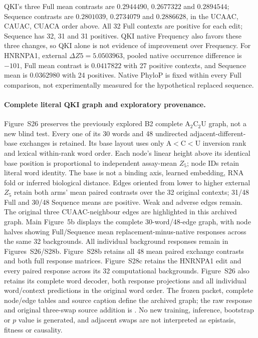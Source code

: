 \documentclass[11pt]{article}
\begin{document}
QKI's three Full mean contrasts are \(0.2944490\), \(0.2677322\) and \(0.2894544\); Sequence contrasts are \(0.2801039\), \(0.2734079\) and \(0.2886628\), in the UCAAC, CAUAC, CUACA order above. All 32 Full contexts are positive for each edit; Sequence has 32, 31 and 31 positives. QKI native Frequency also favors these three changes, so QKI alone is not evidence of improvement over Frequency. For HNRNPA1, external \(\Delta Z5=5.0503963\), pooled native occurrence difference is \(-101\), Full mean contrast is \(0.0417822\) with 27 positive contexts, and Sequence mean is \(0.0362980\) with 24 positives. Native PhyloP is fixed within every Full comparison, not experimentally measured for the hypothetical replaced sequence.

\paragraph{Complete literal QKI graph and exploratory provenance.}
Figure~S26 preserves the previously explored B2 complete A$_2$C$_2$U graph, not a new blind test. Every one of its 30 words and 48 undirected adjacent-different-base exchanges is retained. Its base layout uses only A$<$C$<$U inversion rank and lexical within-rank word order. Each node's linear height above its identical base position is proportional to independent assay-mean $Z_5$; node IDs retain literal word identity. The base is not a binding axis, learned embedding, RNA fold or inferred biological distance. Edges oriented from lower to higher external $Z_5$ retain both arms' mean paired contrasts over the 32 original contexts; 31/48 Full and 30/48 Sequence means are positive. Weak and adverse edges remain. The original three CUAAC-neighbour edges are highlighted in this archived graph. Main Figure~5b displays the complete 30-word/48-edge graph, with node halves showing Full/Sequence mean replacement-minus-native responses across the same 32 backgrounds. All individual background responses remain in Figures~S26/S28b. Figure~S28b retains all 48 mean paired exchange contrasts and both full response matrices. Figure~S28c retains the HNRNPA1 edit and every paired response across its 32 computational backgrounds. Figure~S26 also retains its complete word decoder, both response projections and all individual word/context predictions in the original word order. The frozen packet, complete node/edge tables and source caption define the archived graph; the raw response and original three-swap source addition is . No new training, inference, bootstrap or $p$ value is generated, and adjacent swaps are not interpreted as epistasis, fitness or causality.
\end{document}

